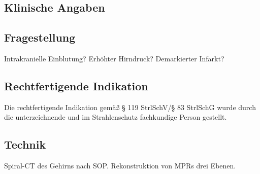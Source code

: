 \documentclass{scrartcl}
\begin{document}
\begin{letter}{\addressee{}}
  \opening{}

  \subsection*{Klinische Angaben}

  \subsection*{Fragestellung}
  Intrakranielle Einblutung? Erhöhter Hirndruck? Demarkierter Infarkt?

  \subsection*{Rechtfertigende Indikation}
  Die rechtfertigende Indikation gemäß § 119 StrlSchV/§ 83 StrlSchG wurde durch die unterzeichnende und im Strahlenschutz fachkundige Person gestellt.

  \subsection*{Technik}
  Spiral-CT des Gehirns nach SOP. Rekonstruktion von MPRs drei Ebenen.


\end{letter}
\end{document}
